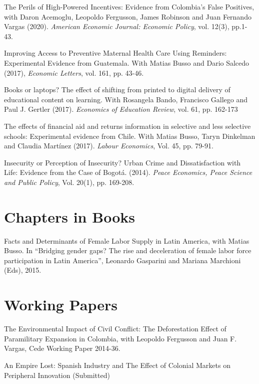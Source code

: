 \documentclass{moderncv}
\begin{document}
{The Perils of High-Powered Incentives: Evidence from Colombia's False Positives, with Daron Acemoglu, Leopoldo Fergusson, James Robinson and Juan Fernando Vargas (2020). \emph{American Economic Journal: Economic Policy}, vol. 12(3), pp.1- 43. \\ }  

{Improving Access to Preventive Maternal Health Care Using Reminders: Experimental Evidence from Guatemala. With Matias Busso and Dario Salcedo (2017), \emph{Economic Letters}, vol. 161, pp. 43-46.\\} 

{Books or laptops? The effect of shifting from printed to digital delivery of educational content on learning. With Rosangela Bando, Francisco Gallego and Paul J. Gertler (2017). \emph{Economics of Education Review}, vol. 61, pp. 162-173\\} 

{The effects of financial aid and returns information in selective and less selective schools: Experimental evidence from Chile. With Matias Busso, Taryn Dinkelman and Claudia Martínez (2017). \emph{Labour Economics}, Vol. 45, pp. 79-91.\\}

{Insecurity or Perception of Insecurity? Urban Crime and Dissatisfaction with Life: Evidence from the Case of Bogot\'a. (2014). \emph{Peace Economics, Peace Science and Public Policy}, Vol. 20(1), pp. 169-208.}

\section{\textbf{Chapters in Books}}
{Facts and Determinants of Female Labor Supply in Latin America, with Matias Busso. In “Bridging gender gaps? The rise and deceleration of female labor force participation in Latin America”, Leonardo Gasparini and Mariana Marchioni (Eds), 2015.}

\section{\textbf{Working Papers}}
{The Environmental Impact of Civil Conflict: The Deforestation Effect of Paramilitary Expansion in Colombia, with Leopoldo Fergusson and Juan F. Vargas, Cede Working Paper 2014-36.\\}

{An Empire Lost: Spanish Industry and The Effect of Colonial Markets on Peripheral  Innovation (Submitted)}
\end{document}
